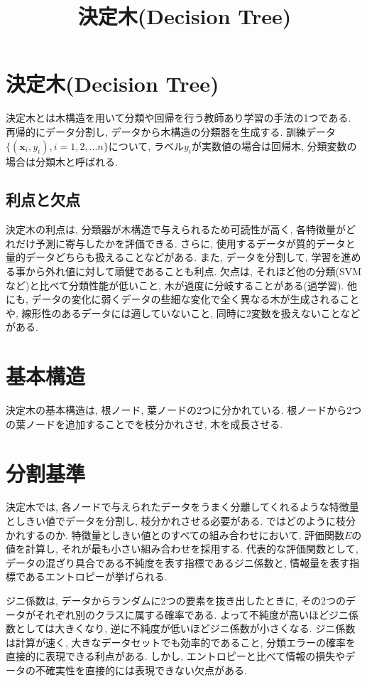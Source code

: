 \documentclass[dvipdfmx, 10pt]{jsarticle}
\title{\textbf{決定木(Decision Tree)}}
\author{}
\date{}
\begin{document}
\maketitle

\section*{決定木(Decision Tree)}
決定木とは木構造を用いて分類や回帰を行う教師あり学習の手法の1つである. 
再帰的にデータ分割し, データから木構造の分類器を生成する. 
訓練データ\(\{(\mathbf{x}_i, y_i), i=1, 2, \dots n\}\)について, 
ラベル\(y_i\)が実数値の場合は回帰木, 分類変数の場合は分類木と呼ばれる. 

\subsection*{利点と欠点}
決定木の利点は, 分類器が木構造で与えられるため可読性が高く, 各特徴量がどれだけ予測に寄与したかを評価できる. 
さらに, 使用するデータが質的データと量的データどちらも扱えることなどがある.  
また, データを分割して, 学習を進める事から外れ値に対して頑健であることも利点. 
欠点は, それほど他の分類(SVMなど)と比べて分類性能が低いこと, 木が過度に分岐することがある(過学習). 
他にも, データの変化に弱くデータの些細な変化で全く異なる木が生成されることや, 線形性のあるデータには適していないこと, 同時に2変数を扱えないことなどがある. 

\section*{基本構造}
決定木の基本構造は, 根ノード, 葉ノードの2つに分かれている. 
根ノードから2つの葉ノードを追加することでを枝分かれさせ, 木を成長させる. 

\section*{分割基準}
決定木では, 各ノードで与えられたデータをうまく分離してくれるような特徴量としきい値でデータを分割し, 枝分かれさせる必要がある. 
ではどのように枝分かれするのか. 特徴量としきい値とのすべての組み合わせにおいて, 評価関数\(E\)の値を計算し, 
それが最も小さい組み合わせを採用する. 
代表的な評価関数として, データの混ざり具合である不純度を表す指標であるジニ係数と, 情報量を表す指標であるエントロピーが挙げられる. 

ジニ係数は, データからランダムに2つの要素を抜き出したときに, その2つのデータがそれぞれ別のクラスに属する確率である. 
よって不純度が高いほどジニ係数としては大きくなり, 逆に不純度が低いほどジニ係数が小さくなる. 
ジニ係数は計算が速く, 大きなデータセットでも効率的であること, 分類エラーの確率を直接的に表現できる利点がある. 
しかし, エントロピーと比べて情報の損失やデータの不確実性を直接的には表現できない欠点がある. 
\end{document}
